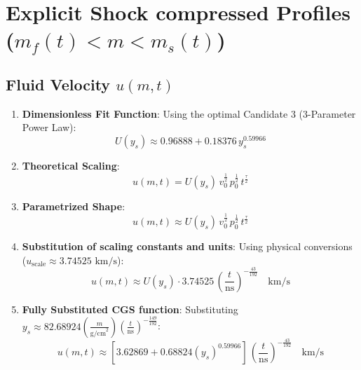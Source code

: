 \documentclass[11pt]{article}
\begin{document}
\section{Explicit Shock compressed Profiles ($m_f(t) < m < m_s(t)$)}

\subsection{Fluid Velocity $u(m,t)$}
\begin{enumerate}
    \item \textbf{Dimensionless Fit Function}:
    Using the optimal Candidate 3 (3-Parameter Power Law):
    $$U(y_s) \approx 0.96888 + 0.18376 \, y_s^{0.59966}$$
    
    \item \textbf{Theoretical Scaling}:
    $$u(m,t) = U(y_s) \, v_0^{\frac{1}{2}} \, p_0^{\frac{1}{2}} \, t^{\frac{\tau}{2}}$$
    
    \item \textbf{Parametrized Shape}:
    $$u(m,t) \approx U(y_s) \, v_0^{\frac{1}{2}} \, p_0^{\frac{1}{2}} \, t^{\frac{\tau}{2}}$$
    
    \item \textbf{Substitution of scaling constants and units}:
    Using physical conversions ($u_{\text{scale}} \approx 3.74525 \text{ km/s}$):
    $$u(m,t) \approx U(y_s) \cdot 3.74525 \, \left(\frac{t}{\text{ns}}\right)^{-\frac{43}{192}} \quad \text{km/s}$$
    
    \item \textbf{Fully Substituted CGS function}:
    Substituting $y_s \approx 82.68924 \left(\frac{m}{\text{g/cm}^2}\right) \left(\frac{t}{\text{ns}}\right)^{-\frac{149}{192}}$:
    $$u(m,t) \approx \left[ 3.62869 + 0.68824 \left(y_s\right)^{0.59966} \right] \, \left(\frac{t}{\text{ns}}\right)^{-\frac{43}{192}} \quad \text{km/s}$$
\end{enumerate}
\end{document}
